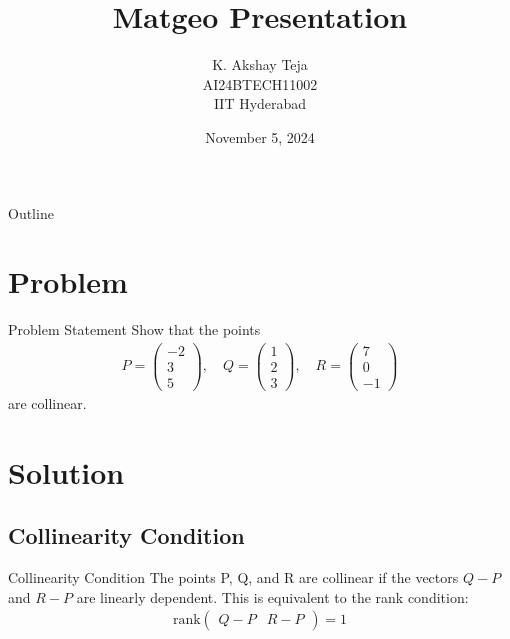 \documentclass{beamer}
\title{Matgeo Presentation}
\author{K. Akshay Teja \\ AI24BTECH11002\\IIT Hyderabad}
\date{November 5, 2024}
\numberwithin{equation}{section}
\begin{document}
\begin{frame}
    \titlepage
\end{frame}

\begin{frame}{Outline}
    \tableofcontents
\end{frame}

\section{Problem}
\begin{frame}{Problem Statement}
    Show that the points 
    \begin{align}
    P = \begin{pmatrix} -2 \\ 3 \\ 5 \end{pmatrix}, \quad Q = \begin{pmatrix} 1 \\ 2 \\ 3 \end{pmatrix}, \quad R = \begin{pmatrix} 7 \\ 0 \\ -1 \end{pmatrix}
    \end{align}
    are collinear.
\end{frame}

\section{Solution}


\subsection{Collinearity Condition}
\begin{frame}{Collinearity Condition}
    The points P, Q, and R are collinear if the vectors $ Q - P $ and $ R - P $ are linearly dependent. This is equivalent to the rank condition:
    \begin{align}
    \text{rank}\begin{pmatrix} Q - P & R - P \end{pmatrix} = 1
    \end{align}
\end{frame}
\end{document}
